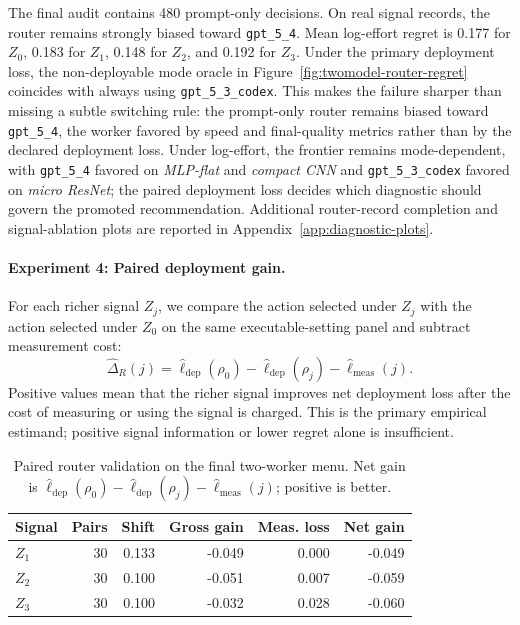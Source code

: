 \documentclass{article}
\begin{document}
The final audit contains 480 prompt-only decisions.
On real signal records, the router remains strongly biased toward \texttt{gpt\_5\_4}.
Mean log-effort regret is 0.177 for \(Z_0\), 0.183 for \(Z_1\), 0.148 for \(Z_2\), and 0.192 for \(Z_3\).
Under the primary deployment loss, the non-deployable mode oracle in Figure~\ref{fig:twomodel-router-regret} coincides with always using \texttt{gpt\_5\_3\_codex}.
This makes the failure sharper than missing a subtle switching rule: the prompt-only router remains biased toward \texttt{gpt\_5\_4}, the worker favored by speed and final-quality metrics rather than by the declared deployment loss.
Under log-effort, the frontier remains mode-dependent, with \texttt{gpt\_5\_4} favored on \textit{MLP-flat} and \textit{compact CNN} and \texttt{gpt\_5\_3\_codex} favored on \textit{micro ResNet}; the paired deployment loss decides which diagnostic should govern the promoted recommendation.
Additional router-record completion and signal-ablation plots are reported in Appendix~\ref{app:diagnostic-plots}.

\paragraph{Experiment 4: Paired deployment gain.}
For each richer signal \(Z_j\), we compare the action selected under \(Z_j\) with the action selected under \(Z_0\) on the same executable-setting panel and subtract measurement cost:
\[
\widehat{\Delta}_R(j)=
\widehat{\ell}_{\mathrm{dep}}(\rho_0)-
\widehat{\ell}_{\mathrm{dep}}(\rho_j)-
\widehat{\ell}_{\mathrm{meas}}(j).
\]
Positive values mean that the richer signal improves net deployment loss after the cost of measuring or using the signal is charged.
This is the primary empirical estimand; positive signal information or lower regret alone is insufficient.

\begin{table}[t]
\centering
\small
\caption{Paired router validation on the final two-worker menu.
Net gain is \(\widehat{\ell}_{\mathrm{dep}}(\rho_0)-\widehat{\ell}_{\mathrm{dep}}(\rho_j)-\widehat{\ell}_{\mathrm{meas}}(j)\); positive is better.}
\label{tab:twomodel-router-gain}
\begin{tabular}{@{}lrrrrr@{}}
\toprule
Signal & Pairs & Shift & Gross gain & Meas. loss & Net gain \\
\midrule
\(Z_1\) & 30 & 0.133 & -0.049 & 0.000 & -0.049 \\
\(Z_2\) & 30 & 0.100 & -0.051 & 0.007 & -0.059 \\
\(Z_3\) & 30 & 0.100 & -0.032 & 0.028 & -0.060 \\
\bottomrule
\end{tabular}
\end{table}
\end{document}
